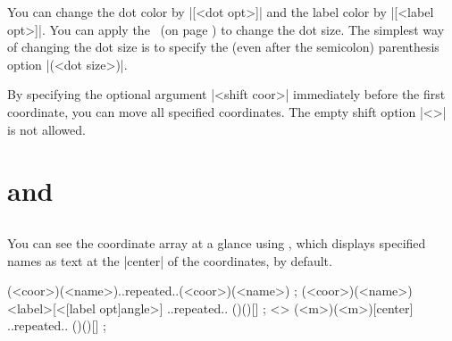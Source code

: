 You can change the dot color by |[<dot opt>]| and the label color by |[<label opt>]|.
You can apply the \threeways\ (on page \pageref{ss:threeways}) to change the dot size. The simplest way of changing the dot size is to specify the  (even after the semicolon) parenthesis option |(<dot size>)|. 

\begin{tzcode}{.3}
{}
\end{tzcode}

By specifying the optional argument |<shift coor>| immediately before the first coordinate, you can move all specified coordinates.
The empty shift option |<>| is not allowed.

\begin{tzcode}{.3}
\end{tzcode}


\section{\protect\cmd{\tzcoorsquick} and \protect\cmd{\tzcoorsquick*}}
\label{s:tzcoorsquick}

\subsection{\protect\cmd{\tzcoorsquick}}
\label{ss:tzcoorsquick}

You can see the coordinate array at a glance using \icmd{\tzcoorsquick}, which displays specified names as text at the |center| of the coordinates, by default.

\begin{tzdef}{}
\tzcoorsquick(<coor>)(<name>)..repeated..(<coor>)(<name>) ;
(<coor>)(<name>){<label>}[<[label opt]angle>]
                                     ..repeated.. ()(){}[] ;
  <> (<m>)(<m>){}[center] ..repeated.. ()(){}[] ;
\end{tzdef}

